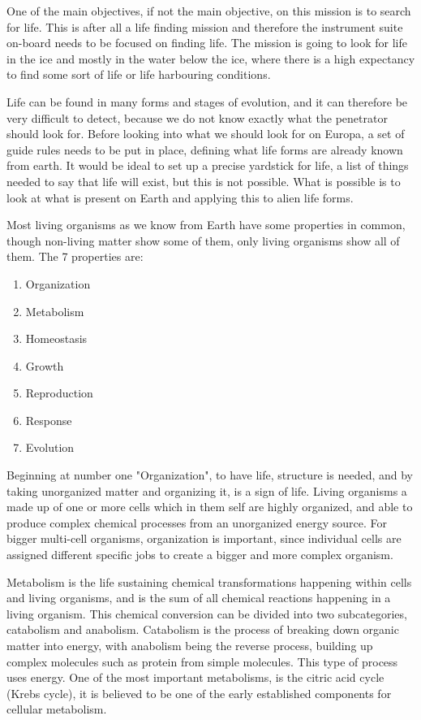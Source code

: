 
One of the main objectives, if not the main objective, on this mission is to search for life. This is after all a life finding mission and therefore the instrument suite on-board needs to be focused on finding life. The mission is going to look for life in the ice and mostly in the water below the ice, where there is a high expectancy to find some sort of life or life harbouring conditions.

Life can be found in many forms and stages of evolution, and it can therefore be very difficult to detect, because we do not know exactly what the penetrator should look for. Before looking into what we should look for on Europa, a set of guide rules needs to be put in place, defining what life forms are already known from earth. It would be ideal to set up a precise yardstick for life, a list of things needed to say that life will exist, but this is not possible. What is possible is to look at what is present on Earth and applying this to alien life forms.

Most living organisms as we know from Earth have some properties in common, though non-living matter show some of them, only living organisms show all of them\cite{WhatIsLife}. The 7 properties are:
\begin{enumerate}
  \item Organization
  \item Metabolism
  \item Homeostasis
  \item Growth
  \item Reproduction
  \item Response
  \item Evolution
\end{enumerate}
Beginning at number one "Organization", to have life, structure is needed, and by taking unorganized matter and organizing it, is a sign of life. Living organisms a made up of one or more cells which in them self are highly organized, and able to produce complex chemical processes from an unorganized energy source. For bigger multi-cell organisms, organization is important, since individual cells are assigned different specific jobs to create a bigger and more complex organism.

Metabolism is the life sustaining chemical transformations happening within cells and living organisms, and is the sum of all chemical reactions happening in a living organism. This chemical conversion can be divided into two subcategories, catabolism and anabolism. Catabolism is the process of breaking down organic matter into energy, with anabolism being the reverse process, building up complex molecules such as protein from simple molecules. This type of process uses energy. One of the most important metabolisms, is the citric acid cycle (Krebs cycle), it is believed to be one of the early established components for cellular metabolism.

